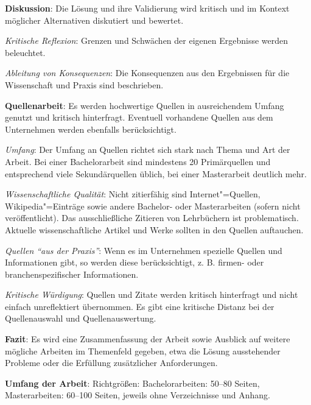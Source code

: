 \begin{checklist}
\begin{checklist}
    \end{checklist}
  \item \textbf{Diskussion}: Die Lösung und ihre Validierung wird kritisch und im Kontext möglicher Alternativen diskutiert und bewertet.
    \begin{checklist}
        \item \textit{Kritische Reflexion}: Grenzen und Schwächen der eigenen Ergebnisse werden beleuchtet.
        \item \textit{Ableitung von Konsequenzen}: Die Konsequenzen aus den Ergebnissen für die Wissenschaft und Praxis sind beschrieben.
    \end{checklist}
  \item \textbf{Quellenarbeit}: Es werden hochwertige Quellen in ausreichendem Umfang genutzt und kritisch hinterfragt. Eventuell vorhandene Quellen aus dem Unternehmen werden ebenfalls berücksichtigt.
    \begin{checklist}
        \item \textit{Umfang}: Der Umfang an Quellen richtet sich stark nach Thema und Art der Arbeit. Bei einer Bachelorarbeit sind mindestens 20 Primärquellen und entsprechend viele Sekundärquellen üblich, bei einer Masterarbeit deutlich mehr.
        \item \textit{Wissenschaftliche Qualität}: Nicht zitierfähig sind Internet"=Quellen, Wikipedia"=Einträge sowie andere Bachelor- oder Masterarbeiten (sofern nicht veröffentlicht). Das ausschließliche Zitieren von Lehrbüchern ist problematisch. Aktuelle wissenschaftliche Artikel und Werke sollten in den Quellen auftauchen.
        \item \textit{Quellen \enquote{aus der Praxis}}: Wenn es im Unternehmen spezielle Quellen und Informationen gibt, so werden diese berücksichtigt, z. B. firmen- oder branchenspezifischer Informationen.
        \item \textit{Kritische Würdigung}: Quellen und Zitate werden kritisch hinterfragt und nicht einfach unreflektiert übernommen. Es gibt eine kritische Distanz bei der Quellenauswahl und Quellenauswertung.
    \end{checklist}
  \item \textbf{Fazit}: Es wird eine Zusammenfassung der Arbeit sowie Ausblick auf weitere mögliche Arbeiten im Themenfeld gegeben, etwa die Lösung ausstehender Probleme oder die Erfüllung zusätzlicher Anforderungen.
  \item \textbf{Umfang der Arbeit}: Richtgrößen: Bachelorarbeiten: 50--80 Seiten, Masterarbeiten: 60--100 Seiten, jeweils ohne Verzeichnisse und Anhang.
\end{checklist}

